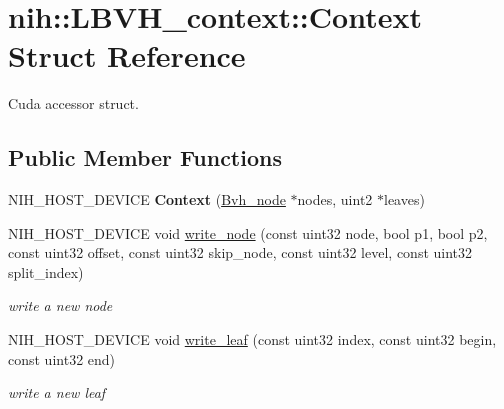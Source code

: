 \hypertarget{structnih_1_1_l_b_v_h__context_1_1_context}{
\section{nih\-:\-:\-L\-B\-V\-H\-\_\-context\-:\-:\-Context \-Struct \-Reference}
\label{structnih_1_1_l_b_v_h__context_1_1_context}
}


\-Cuda accessor struct.  


\subsection*{\-Public \-Member \-Functions}
\begin{DoxyCompactItemize}
\item 
\hypertarget{structnih_1_1_l_b_v_h__context_1_1_context_a7db539520707a6af78a676aec5a4a5bd}{
\-N\-I\-H\-\_\-\-H\-O\-S\-T\-\_\-\-D\-E\-V\-I\-C\-E {\bfseries \-Context} (\hyperlink{structnih_1_1_bvh__node}{\-Bvh\-\_\-node} $\ast$nodes, uint2 $\ast$leaves)}
\label{structnih_1_1_l_b_v_h__context_1_1_context_a7db539520707a6af78a676aec5a4a5bd}

\item 
\hypertarget{structnih_1_1_l_b_v_h__context_1_1_context_a7fd4672c2e3a32a291862e598b0d5d39}{
\-N\-I\-H\-\_\-\-H\-O\-S\-T\-\_\-\-D\-E\-V\-I\-C\-E void \hyperlink{structnih_1_1_l_b_v_h__context_1_1_context_a7fd4672c2e3a32a291862e598b0d5d39}{write\-\_\-node} (const uint32 node, bool p1, bool p2, const uint32 offset, const uint32 skip\-\_\-node, const uint32 level, const uint32 split\-\_\-index)}
\label{structnih_1_1_l_b_v_h__context_1_1_context_a7fd4672c2e3a32a291862e598b0d5d39}

\begin{DoxyCompactList}\small\item\em write a new node \end{DoxyCompactList}\item 
\hypertarget{structnih_1_1_l_b_v_h__context_1_1_context_ac6d102b14fa92503b65859a096a48628}{
\-N\-I\-H\-\_\-\-H\-O\-S\-T\-\_\-\-D\-E\-V\-I\-C\-E void \hyperlink{structnih_1_1_l_b_v_h__context_1_1_context_ac6d102b14fa92503b65859a096a48628}{write\-\_\-leaf} (const uint32 index, const uint32 begin, const uint32 end)}
\label{structnih_1_1_l_b_v_h__context_1_1_context_ac6d102b14fa92503b65859a096a48628}

\begin{DoxyCompactList}\small\item\em write a new leaf \end{DoxyCompactList}\end{DoxyCompactItemize}
